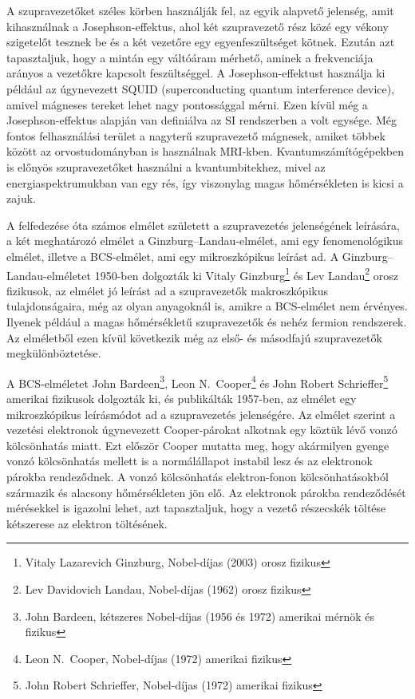 \documentclass[a4paper,12pt,titlepage]{article}
\begin{document}
A szupravezetőket széles körben használják fel, az egyik alapvető jelenség, amit kihasználnak a Josephson-effektus, ahol két szupravezető rész közé egy vékony szigetelőt tesznek be és a két vezetőre egy egyenfeszültséget kötnek.  Ezután azt tapasztaljuk, hogy a mintán egy váltóáram mérhető, aminek a frekvenciája arányos a vezetőkre kapcsolt feszültséggel.  A Josephson-effektust használja ki például az úgynevezett SQUID (superconducting quantum interference device), amivel mágneses tereket lehet nagy pontossággal mérni.  Ezen kívül még a Josephson-effektus alapján van definiálva az SI rendszerben a volt egysége.  Még fontos felhasználási terület a nagyterű szupravezető mágnesek, amiket többek között az orvostudományban is használnak MRI-kben.  Kvantumszámítógépekben is előnyös szupravezetőket használni a kvantumbitekhez, mivel az energiaspektrumukban van egy rés, így viszonylag magas hőmérsékleten is kicsi a zajuk.

A felfedezése óta számos elmélet született a szupravezetés jelenségének leírására, a két meghatározó elmélet a Ginzburg--Landau-elmélet, ami egy fenomenológikus elmélet, illetve a BCS-elmélet, ami egy mikroszkópikus leírást ad.
A Ginzburg--Landau-elméletet 1950-ben dolgozták ki Vitaly Ginzburg\footnote{Vitaly Lazarevich Ginzburg, Nobel-díjas (2003) orosz fizikus} és Lev Landau\footnote{Lev Davidovich Landau, Nobel-díjas (1962) orosz fizikus} orosz fizikusok, az elmélet jó leírást ad a szupravezetők makroszkópikus tulajdonságaira, még az olyan anyagoknál is, amikre a BCS-elmélet nem érvényes.  Ilyenek például a magas hőmérsékletű szupravezetők és nehéz fermion rendszerek.  Az elméletből ezen kívül következik még az első- és másodfajú szupravezetők megkülönböztetése.

A BCS-elméletet John Bardeen\footnote{John Bardeen, kétszeres Nobel-díjas (1956 és 1972) amerikai mérnök és fizikus}, Leon N.\ Cooper\footnote{Leon N.\ Cooper, Nobel-díjas (1972) amerikai fizikus} és John Robert Schrieffer\footnote{John Robert Schrieffer, Nobel-díjas (1972) amerikai fizikus} amerikai fizikusok dolgozták ki, és publikálták 1957-ben, az elmélet egy mikroszkópikus leírásmódot ad a szupravezetés jelenségére.  Az elmélet szerint a vezetési elektronok úgynevezett Cooper-párokat alkotnak egy köztük lévő vonzó kölcsönhatás miatt.  Ezt először Cooper mutatta meg, hogy akármilyen gyenge vonzó kölcsönhatás mellett is a normálállapot instabil lesz és az elektronok párokba rendeződnek.  A vonzó kölcsönhatás elektron-fonon kölcsönhatásokból származik és alacsony hőmérsékleten jön elő.  Az elektronok párokba rendeződését mérésekkel is igazolni lehet, azt tapasztaljuk, hogy a vezető részecskék töltése kétszerese az elektron töltésének.
\end{document}
